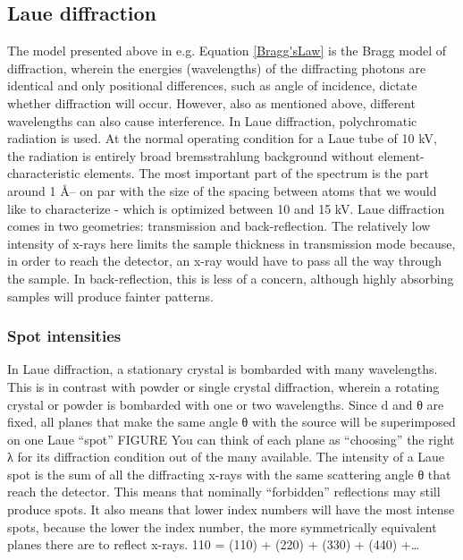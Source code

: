 \subsection{Laue diffraction}
The model presented above in e.g. Equation \ref{Bragg'sLaw} is the Bragg model of diffraction, wherein the energies (wavelengths) of the diffracting photons are identical and only positional differences, such as angle of incidence, dictate whether diffraction will occur. However, also as mentioned above, different wavelengths can also cause interference. In Laue diffraction, polychromatic radiation is used. At the normal operating condition for a Laue tube of 10 kV, the radiation is entirely broad bremsstrahlung background without element-characteristic elements. The most important part of the spectrum is the part around 1 \AA – on par with the size of the spacing between atoms that we would like to characterize - which is optimized between 10 and 15 kV. Laue diffraction comes in two geometries: transmission and back-reflection. The relatively low intensity of x-rays here limits the sample thickness in transmission mode because, in order to reach the detector, an x-ray would have to pass all the way through the sample. In back-reflection, this is less of a concern, although highly absorbing samples will produce fainter patterns.

\subsubsection{Spot intensities}
In Laue diffraction, a stationary crystal is bombarded with many wavelengths. This is in contrast with powder or single crystal diffraction, wherein a rotating crystal or powder is bombarded with one or two wavelengths. Since d and θ are fixed, all planes that make the same angle θ with the source will be superimposed on one Laue “spot” FIGURE
You can think of each plane as “choosing” the right λ for its diffraction condition out of the many available. The intensity of a Laue spot is the sum of all the diffracting x-rays with the same scattering angle θ that reach the detector.
This means that nominally “forbidden” reflections may still produce spots.
It also means that lower index numbers will have the most intense spots, because the lower the index number, the more symmetrically equivalent planes there are to reflect x-rays.
{110} = (110) + (220) + (330) + (440) +…

